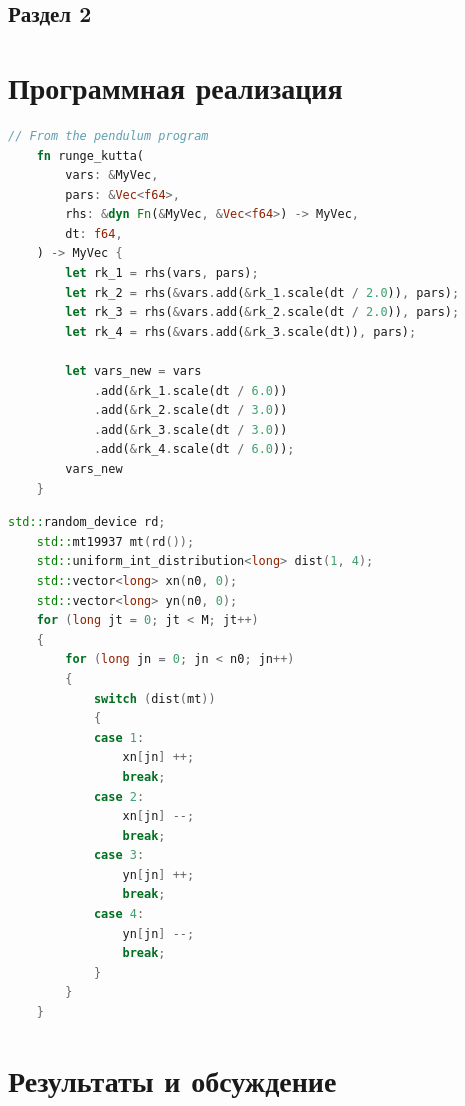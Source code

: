 \documentclass[a4paper,14pt]{extarticle}
\begin{document}
\subsection{Раздел 2}

\pagebreak
\section{Программная реализация}

\begin{lstlisting}[language=rust,caption={Программная реализация метода Рунге-Кутты},label={listing-1}]
    // From the pendulum program
    fn runge_kutta(
        vars: &MyVec,
        pars: &Vec<f64>,
        rhs: &dyn Fn(&MyVec, &Vec<f64>) -> MyVec,
        dt: f64,
    ) -> MyVec {
        let rk_1 = rhs(vars, pars);
        let rk_2 = rhs(&vars.add(&rk_1.scale(dt / 2.0)), pars);
        let rk_3 = rhs(&vars.add(&rk_2.scale(dt / 2.0)), pars);
        let rk_4 = rhs(&vars.add(&rk_3.scale(dt)), pars);
    
        let vars_new = vars
            .add(&rk_1.scale(dt / 6.0))
            .add(&rk_2.scale(dt / 3.0))
            .add(&rk_3.scale(dt / 3.0))
            .add(&rk_4.scale(dt / 6.0));
        vars_new
    }
    \end{lstlisting}
    
    \begin{lstlisting}[language=C++,caption={Подпрограмма случайного блуждания на плоскости},label={listing-2}]
    std::random_device rd;
    std::mt19937 mt(rd());
    std::uniform_int_distribution<long> dist(1, 4);
    std::vector<long> xn(n0, 0);
    std::vector<long> yn(n0, 0);
    for (long jt = 0; jt < M; jt++)
    {
        for (long jn = 0; jn < n0; jn++)
        {
            switch (dist(mt))
            {
            case 1:
                xn[jn] ++;
                break;
            case 2:
                xn[jn] --;
                break;
            case 3:
                yn[jn] ++;
                break;
            case 4:
                yn[jn] --;
                break;
            }
        }
    }
    \end{lstlisting}

\pagebreak
\section{Результаты и обсуждение}
\end{document}
